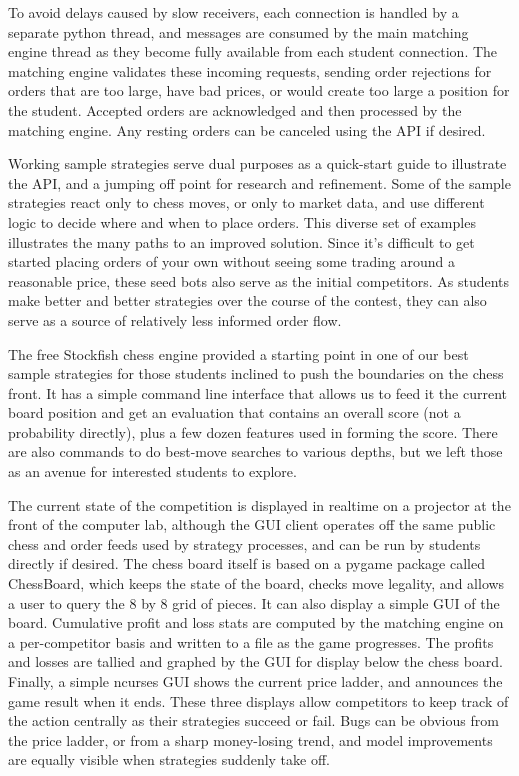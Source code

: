 \documentclass{article}
\begin{document}
To avoid delays caused by slow receivers, each connection is handled by a separate python thread,
and messages are consumed by the main matching engine thread as they become fully available from
each student connection. The matching engine validates these incoming requests, sending order
rejections for orders that are too large, have bad prices, or would create too large a position for
the student. Accepted orders are acknowledged and then processed by the matching engine. Any resting
orders can be canceled using the API if desired.

Working sample strategies serve dual purposes as a quick-start guide to illustrate the API, and a
jumping off point for research and refinement. Some of the sample strategies react only to chess
moves, or only to market data, and use different logic to decide where and when to place
orders. This diverse set of examples illustrates the many paths to an improved solution. Since it's
difficult to get started placing orders of your own without seeing some trading around a reasonable
price, these seed bots also serve as the initial competitors. As students make better and better
strategies over the course of the contest, they can also serve as a source of relatively less
informed order flow.

The free Stockfish chess engine provided a starting point in one of our best sample strategies for
those students inclined to push the boundaries on the chess front. It has a simple command line
interface that allows us to feed it the current board position and get an evaluation that contains
an overall score (not a probability directly), plus a few dozen features used in forming the
score. There are also commands to do best-move searches to various depths, but we left those as an
avenue for interested students to explore.

The current state of the competition is displayed in realtime on a projector at the front of the
computer lab, although the GUI client operates off the same public chess and order feeds used by
strategy processes, and can be run by students directly if desired. The chess board itself is based
on a pygame package called ChessBoard, which keeps the state of the board, checks move legality, and
allows a user to query the 8 by 8 grid of pieces. It can also display a simple GUI of the
board. Cumulative profit and loss stats are computed by the matching engine on a per-competitor
basis and written to a file as the game progresses. The profits and losses are tallied and graphed
by the GUI for display below the chess board. Finally, a simple ncurses GUI shows the current price
ladder, and announces the game result when it ends. These three displays allow competitors to keep
track of the action centrally as their strategies succeed or fail. Bugs can be obvious from the
price ladder, or from a sharp money-losing trend, and model improvements are equally visible when
strategies suddenly take off.
\end{document}
